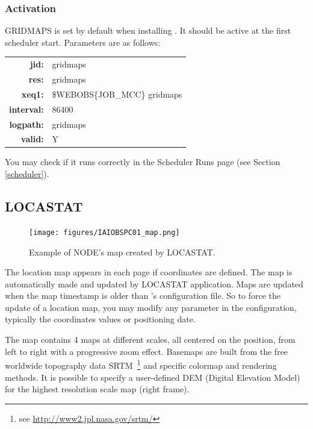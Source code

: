 \subsubsection{Activation}

GRIDMAPS is set by default when installing \webobs. It should be active at the first scheduler start. Parameters are as follows:

\begin{tabular}{rl}
\textbf{jid:}      & gridmaps \\
\textbf{res:}      & gridmaps \\
\textbf{xeq1:}     & \$WEBOBS\{JOB\_MCC\} gridmaps \\
\textbf{interval:} & 86400 \\
\textbf{logpath:}  & gridmaps \\
\textbf{valid:}    & Y \\
\end{tabular}

You may check if it runs correctly in the Scheduler Runs page (see Section \ref{scheduler}).


\subsection{LOCASTAT}
\label{locastat}

\begin{figure}
\texttt{[image: figures/IAIOBSPC01\_map.png]}
\caption{Example of NODE's map created by LOCASTAT.}
\end{figure}

The location map appears in each  page if coordinates are defined. The map is automatically made and updated by LOCASTAT application. Maps are updated when the map timestamp is older than 's configuration file. So to force the update of a location map, you may modify any parameter in the  configuration, typically the coordinates values or positioning date. 

The map contains 4 maps at different scales, all centered on the  position, from left to right with a progressive zoom effect. Basemaps are built from the free worldwide topography data SRTM~\footnote{see \url{http://www2.jpl.nasa.gov/srtm/}} and specific colormap and rendering methods. It is possible to specify a user-defined DEM (Digital Elevation Model) for the highest resolution scale map (right frame).





